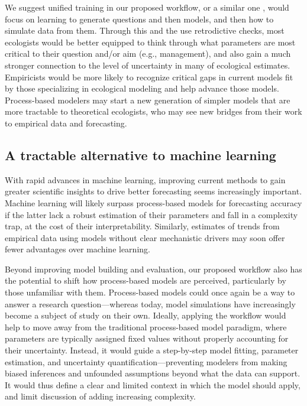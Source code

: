\documentclass[11pt]{article}
\newcommand{\llabel}[1]{\hypertarget{lintarget:#1}{}\linelabel{lin:#1}}
\begin{document}
We suggest unified training in our proposed workflow, or a similar one \citep{betanworkflow,Gelman2020, grinsztajn2021,vandeschoot2021}, would focus on learning to generate questions and then models, and then how to simulate data from them. Through this and the use retrodictive checks, most ecologists would be better equipped to think through what parameters are most critical to their question and/or aim (e.g., management), and also gain a much stronger connection to the level of uncertainty in many of ecological estimates. Empiricists would be more likely to recognize critical gaps in current models fit by those specializing in ecological modeling and help advance those models. Process-based modelers may start a new generation of simpler models that are more tractable to theoretical ecologists, who may see new bridges from their work to empirical data and forecasting.

\subsection{A tractable alternative to machine learning}

With rapid advances in machine learning, improving current methods to gain greater scientific insights to drive better forecasting seems increasingly important. \llabel{MLvsPBM}Machine learning will likely surpass process-based models for forecasting accuracy if the latter lack a robust estimation of their parameters and fall in a complexity trap, at the cost of their interpretability. Similarly, estimates of trends from empirical data using models without clear mechanistic drivers may soon offer fewer advantages over machine learning. 

Beyond improving model building and evaluation, our proposed workflow also has the potential to shift how process-based models are perceived, particularly by those unfamiliar with them.
Process-based models could once again be a way to answer a research question---whereas today, model simulations have increasingly become a subject of study on their own.
Ideally, applying the workflow would help to move away from the traditional process-based model paradigm, where parameters are typically assigned fixed values without properly accounting for their uncertainty. Instead, it would guide a step-by-step model fitting, parameter estimation, and uncertainty quantification---preventing modelers from making biased inferences and unfounded assumptions beyond what the data can support. It would thus define a clear and limited context in which the model should apply, and limit discussion of adding increasing complexity. 
\end{document}
